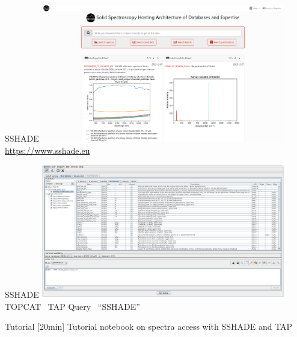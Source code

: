 \begin{frame}[t]{SSHADE}
  \includegraphics[width=0.8\textwidth]{gfx/demo_sshade}
  \url{https://www.sshade.eu}
\end{frame}

\begin{frame}[t]{SSHADE}
  \includegraphics[width=0.8\textwidth]{gfx/demo_tap}\\
  TOPCAT \textrightarrow~TAP Query \textrightarrow~``SSHADE''
\end{frame}

\begin{frame}[t]{Tutorial}
  [20min] Tutorial notebook on spectra access with SSHADE and TAP
\end{frame}
